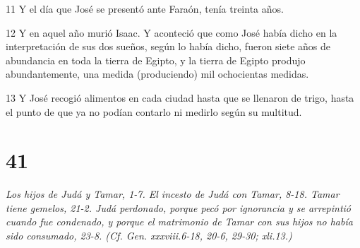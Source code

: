 \par 11 Y el día que José se presentó ante Faraón, tenía treinta años.
\par 12 Y en aquel año murió Isaac. Y aconteció que como José había dicho en la interpretación de sus dos sueños, según lo había dicho, fueron siete años de abundancia en toda la tierra de Egipto, y la tierra de Egipto produjo abundantemente, una medida (produciendo) mil ochocientas medidas.
\par 13 Y José recogió alimentos en cada ciudad hasta que se llenaron de trigo, hasta el punto de que ya no podían contarlo ni medirlo según su multitud.

\chapter{41}

\par \textit{Los hijos de Judá y Tamar, 1-7. El incesto de Judá con Tamar, 8-18. Tamar tiene gemelos, 21-2. Judá perdonado, porque pecó por ignorancia y se arrepintió cuando fue condenado, y porque el matrimonio de Tamar con sus hijos no había sido consumado, 23-8. (Cf. Gen. xxxviii.6-18, 20-6, 29-30; xli.13.)}

